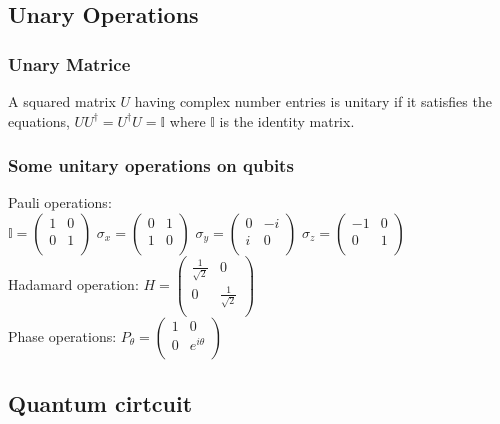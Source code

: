 \documentclass[5pt]{article}
\begin{document}
\begin{multicols}{3}
\subsection{Unary Operations}
\subsubsection{Unary Matrice}
A squared matrix $U$ having complex number entries is unitary if it satisfies the equations, 
$UU^\dagger=U^\dagger U=\mathbb{I}$ where $\mathbb{I}$ is the identity matrix.

\subsubsection{Some unitary operations on qubits}
Pauli operations:\\
$\mathbb{I}=\begin{pmatrix}
     1 & 0 \\
     0 & 1 \\
\end{pmatrix}$ 
$\sigma_x =\begin{pmatrix}
     0 & 1 \\
     1 & 0 \\
\end{pmatrix}$
$\sigma_y =\begin{pmatrix}
     0 & -i \\
     i & 0 \\
\end{pmatrix}$
$\sigma_z =\begin{pmatrix}
    -1 & 0 \\
     0 & 1 \\
\end{pmatrix}$ \\
Hadamard operation: 
$H =\begin{pmatrix}
     \frac{1}{\sqrt{2}} & 0 \\
     0 & \frac{1}{\sqrt{2}} \\
\end{pmatrix}$ \\
Phase operations:
$P_\theta =\begin{pmatrix}
     1 & 0 \\
     0 & e^{i\theta} \\
\end{pmatrix}$ \\



\subsection{Quantum cirtcuit}


\end{multicols}
\end{document}
